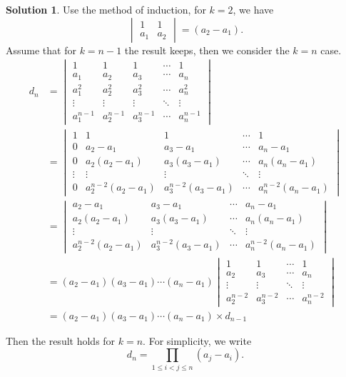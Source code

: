 \documentclass{article}
\theoremstyle{definition}
\newtheorem{solution}{Solution}[section]
\begin{document}
\begin{solution}
Use the method of induction, for $k=2$, we have
$$
\begin{vmatrix}
    1 & 1 \\
    a_{1} & a_{2}
\end{vmatrix}
=(a_{2}-a_{1}).$$
Assume that for $k=n-1$ the result keeps, then we
consider the $k=n$ case.
\begin{align*}
d_{n} 
& =
\begin{vmatrix}
    1 & 1 & 1 & \cdots & 1 \\
    a_{1} & a_{2} & a_{3} & \cdots & a_{n} \\
    a_{1}^{2} & a_{2}^{2} & a_{3}^{2} & \cdots & a_{n}^{2} \\
    \vdots & \vdots & \vdots & \ddots & \vdots \\
    a_{1}^{n-1} & a_{2}^{n-1} & a_{3}^{n-1} & \cdots & a_{n}^{n-1}
\end{vmatrix}\\
& =
\begin{vmatrix}
    1 & 1 & 1 & \cdots & 1 \\
    0 & a_{2}-a_{1} & a_{3}-a_{1} & \cdots & a_{n}-a_{1} \\
    0 & a_{2}(a_{2}-a_{1}) & a_{3}(a_{3}-a_{1}) & \cdots & a_{n}(a_{n}-a_{1}) \\
    \vdots & \vdots & \vdots & \ddots & \vdots \\
    0 & a_{2}^{n-2}(a_{2}-a_{1}) & a_{3}^{n-2}(a_{3}-a_{1}) & \cdots & a_{n}^{n-2}(a_{n}-a_{1})
\end{vmatrix}\\
& =
\begin{vmatrix}
    a_{2}-a_{1} & a_{3}-a_{1} & \cdots & a_{n}-a_{1} \\
    a_{2}(a_{2}-a_{1}) & a_{3}(a_{3}-a_{1}) & \cdots & a_{n}(a_{n}-a_{1}) \\
    \vdots & \vdots & \ddots & \vdots \\
    a_{2}^{n-2}(a_{2}-a_{1}) & a_{3}^{n-2}(a_{3}-a_{1}) & \cdots & a_{n}^{n-2}(a_{n}-a_{1})
\end{vmatrix}\\
& =
(a_{2}-a_{1})(a_{3}-a_{1})\cdots(a_{n}-a_{1})
\begin{vmatrix}
    1 & 1 & \cdots & 1 \\
    a_{2} & a_{3} & \cdots & a_{n} \\
    \vdots & \vdots & \ddots & \vdots \\
    a_{2}^{n-2} & a_{3}^{n-2} & \cdots & a_{n}^{n-2}
\end{vmatrix}\\
& =
(a_{2}-a_{1})(a_{3}-a_{1})\cdots(a_{n}-a_{1})\times d_{n-1}
\end{align*}

Then the result holds for $k=n$. For simplicity, we write 
$$d_{n}=\prod_{1\leq i<j\leq n}(a_{j}-a_{i}).$$
\end{solution}
\end{document}
